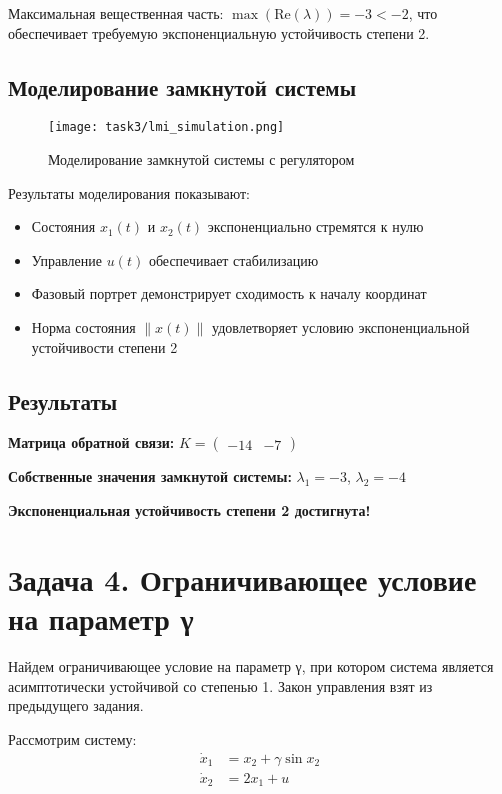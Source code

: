 Максимальная вещественная часть: $\max(\text{Re}(\lambda)) = -3 < -2$, что обеспечивает требуемую экспоненциальную устойчивость степени 2.

\subsection*{Моделирование замкнутой системы}

\begin{figure}[H]
\centering
\texttt{[image: task3/lmi\_simulation.png]}
\caption{Моделирование замкнутой системы с регулятором}
\label{fig:lmi_simulation}
\end{figure}

Результаты моделирования показывают:
\begin{itemize}
\item Состояния $x_1(t)$ и $x_2(t)$ экспоненциально стремятся к нулю
\item Управление $u(t)$ обеспечивает стабилизацию
\item Фазовый портрет демонстрирует сходимость к началу координат
\item Норма состояния $\|x(t)\|$ удовлетворяет условию экспоненциальной устойчивости степени 2
\end{itemize}

\subsection*{Результаты}

\textbf{Матрица обратной связи:} $K = \begin{pmatrix} -14 & -7 \end{pmatrix}$

\textbf{Собственные значения замкнутой системы:} $\lambda_1 = -3$, $\lambda_2 = -4$

\textbf{Экспоненциальная устойчивость степени 2 достигнута!}

\section*{Задача 4. Ограничивающее условие на параметр γ}

Найдем ограничивающее условие на параметр γ, при котором система является асимптотически устойчивой со степенью 1. Закон управления взят из предыдущего задания.

Рассмотрим систему:
\begin{align}
\dot{x}_1 &= x_2 + \gamma \sin x_2 \\
\dot{x}_2 &= 2x_1 + u
\end{align}

